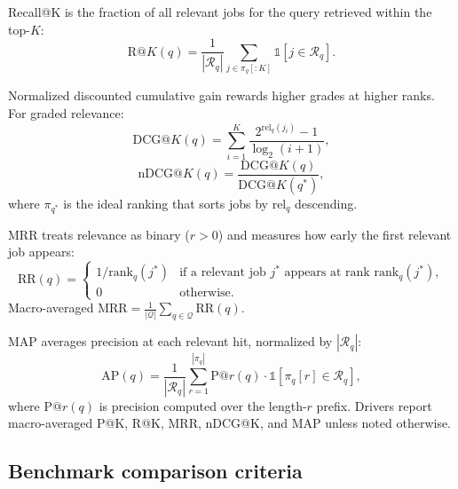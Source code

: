 Recall@K is the fraction of all relevant jobs for the query retrieved within the top-$K$:
\begin{equation}
  \mathrm{R@}K(q) = \frac{1}{|\mathcal{R}_q|}\sum_{j \in \pi_q[:K]} \mathbb{1}[j \in \mathcal{R}_q].
  \label{eq:r-at-k}
\end{equation}

Normalized discounted cumulative gain rewards higher grades at higher ranks.
For graded relevance:
\begin{equation}
  \mathrm{DCG@}K(q) = \sum_{i=1}^{K} \frac{2^{\mathrm{rel}_q(j_i)} - 1}{\log_2(i+1)},
  \label{eq:dcg}
\end{equation}
\begin{equation}
  \mathrm{nDCG@}K(q) = \frac{\mathrm{DCG@}K(q)}{\mathrm{DCG@}K(q^\ast)},
  \label{eq:ndcg}
\end{equation}
where $\pi_{q^\ast}$ is the ideal ranking that sorts jobs by $\mathrm{rel}_q$ descending.

MRR treats relevance as binary ($r>0$) and measures how early the first relevant job appears:
\begin{equation}
  \mathrm{RR}(q) =
    \begin{cases}
      1 / \mathrm{rank}_q(j^\ast) & \text{if a relevant job } j^\ast \text{ appears at rank } \mathrm{rank}_q(j^\ast),\\
      0 & \text{otherwise}.
    \end{cases}
  \label{eq:mrr}
\end{equation}
Macro-averaged $\mathrm{MRR} = \frac{1}{|\mathcal{Q}|}\sum_{q \in \mathcal{Q}} \mathrm{RR}(q)$.

MAP averages precision at each relevant hit, normalized by $|\mathcal{R}_q|$:
\begin{equation}
  \mathrm{AP}(q) = \frac{1}{|\mathcal{R}_q|}
    \sum_{r=1}^{|\pi_q|}
    \mathrm{P@}r(q) \cdot \mathbb{1}[\pi_q[r] \in \mathcal{R}_q],
  \label{eq:map}
\end{equation}
where $\mathrm{P@}r(q)$ is precision computed over the length-$r$ prefix.
Drivers report macro-averaged P@K, R@K, MRR, nDCG@K, and MAP unless noted otherwise.

\subsection{Benchmark comparison criteria}\label{sec:5-benchmark-criteria}

